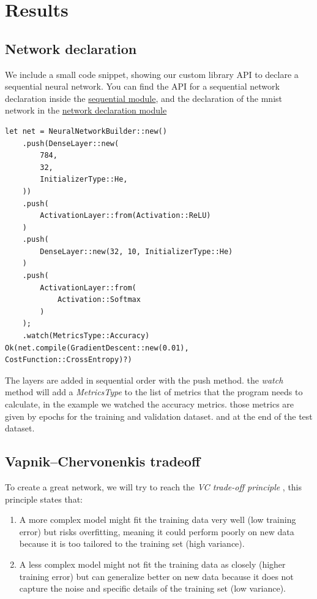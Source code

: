 \documentclass[a4paper, twocolumn, twoside]{article}
\begin{document}
	\section{Results}
    \subsection{Network declaration}
	We include a small code snippet, showing our custom library API to declare a sequential neural network. You can find the API for a sequential network declaration inside the \href{https://github.com/dirdr/neural_network_from_scratch/blob/main/nn_lib/src/sequential.rs}{sequential module}, and the declaration of the mnist network in the \href{https://github.com/dirdr/neural_network_from_scratch/blob/main/mnist/src/network_definition.rs}{network declaration module}

	\begin{verbatim}
let net = NeuralNetworkBuilder::new()
	.push(DenseLayer::new(
		784,
		32,
		InitializerType::He,
	))
	.push(
		ActivationLayer::from(Activation::ReLU)
	)
	.push(
		DenseLayer::new(32, 10, InitializerType::He)
	)
	.push(
		ActivationLayer::from(
			Activation::Softmax
		)
	);
	.watch(MetricsType::Accuracy)
Ok(net.compile(GradientDescent::new(0.01), CostFunction::CrossEntropy)?)
	\end{verbatim}

	The layers are added in sequential order with the push method.
	the \textit{watch} method will add a \textit{MetricsType} to the list of metrics that the program needs to calculate, in the example we watched the accuracy metrics.
	those metrics are given by epochs for the training and validation dataset. and at the end of the test dataset.

    \subsection{Vapnik–Chervonenkis tradeoff}

	To create a great network, we will try to reach the \textit{VC trade-off principle} \cite{LeCun2019} \cite{vapnik1974theory},
	this principle states that:

	\begin{enumerate}
		\item A more complex model might fit the training data very well (low training error)
			but risks overfitting, meaning it could perform poorly on new data
			because it is too tailored to the training set (high variance).
		\item A less complex model might not fit the training data as closely 
			(higher training error) but can generalize better on new data because 
			it does not capture the noise and specific details of the training set (low variance).
	\end{enumerate}
\end{document}
